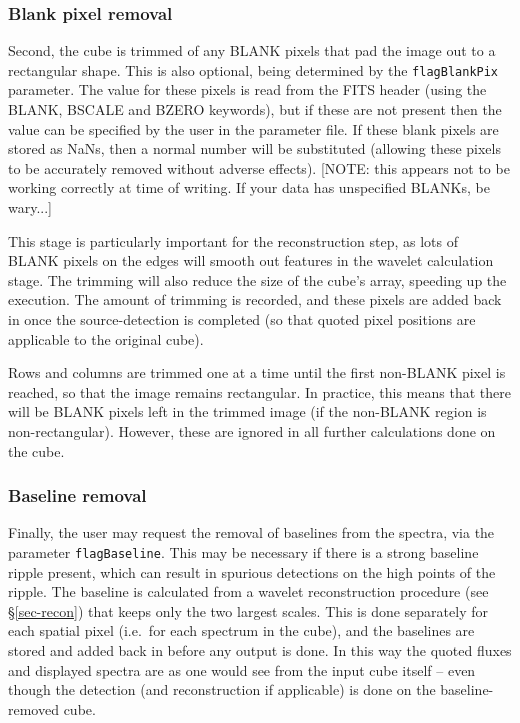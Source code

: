 \documentclass[12pt,a4paper]{article}
\newcommand{\ie}{i.e.\ }
\begin{document}
\subsubsection{Blank pixel removal}

Second, the cube is trimmed of any BLANK pixels that pad the image
out to a rectangular shape. This is also optional, being determined by
the {\tt flagBlankPix} parameter. The value for these pixels is read from
the FITS header (using the BLANK, BSCALE and BZERO keywords), but if
these are not present then the value can be specified by the user in
the parameter file. If these blank pixels are stored as NaNs, then a
normal number will be substituted (allowing these pixels to be
accurately removed without adverse effects). [NOTE: this appears not
  to be working correctly at time of writing. If your data has
  unspecified BLANKs, be wary...]

This stage is particularly important for the reconstruction step, as
lots of BLANK pixels on the edges will smooth out features in the
wavelet calculation stage. The trimming will also reduce the size of
the cube's array, speeding up the execution. The amount of trimming is
recorded, and these pixels are added back in once the source-detection
is completed (so that quoted pixel positions are applicable to the
original cube).

Rows and columns are trimmed one at a time until the first non-BLANK
pixel is reached, so that the image remains rectangular. In practice,
this means that there will be BLANK pixels left in the trimmed image
(if the non-BLANK region is non-rectangular). However, these are
ignored in all further calculations done on the cube.

\subsubsection{Baseline removal}

Finally, the user may request the removal of baselines from the
spectra, via the parameter {\tt flagBaseline}. This may be necessary
if there is a strong baseline ripple present, which can result in
spurious detections on the high points of the ripple. The baseline is
calculated from a wavelet reconstruction procedure (see
\S\ref{sec-recon}) that keeps only the two largest scales. This is
done separately for each spatial pixel (\ie for each spectrum in the
cube), and the baselines are stored and added back in before any
output is done. In this way the quoted fluxes and displayed spectra
are as one would see from the input cube itself -- even though the
detection (and reconstruction if applicable) is done on the
baseline-removed cube.
\end{document}
